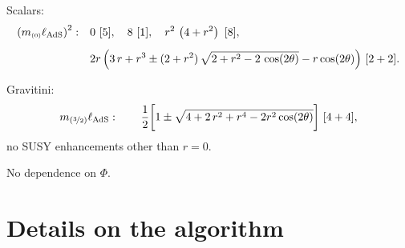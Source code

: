 \documentclass[11pt]{article}
\def\sst#1{{\scriptscriptstyle #1}}
\def\sst#1{{\scriptscriptstyle #1}}
\begin{document}
Scalars:
\begin{equation}
	\begin{aligned}	
		\left(m_{\sst{(0)}}\ell_{\rm AdS}\right)^2:\quad&
		0\ [5],	\quad
		8\ [1],	\quad
		r^{2}\,\left(4+r^2\right)\ [8],	\\[5pt]
		&	2r\,\Big(3\,r+r^{3}\pm(2+r^{2})\,\sqrt{2+r^2-2\,\cos(2\theta)}-r\cos(2\theta)\Big)\ [2+2].
	\end{aligned}
\end{equation}

Gravitini:
\begin{equation}
	m_{{(\nicefrac32)}}\ell_{\rm AdS}:\quad 
	\quad \dfrac1{2}\bigg[1\pm\sqrt{4+2\,r^{2}+r^{4}-2r^{2}\cos(2\theta)}\bigg]\ [4+4],
\end{equation}
no SUSY enhancements other than $r=0$.

No dependence on $\Phi$.

\newpage
\section{Details on the algorithm}
\end{document}
